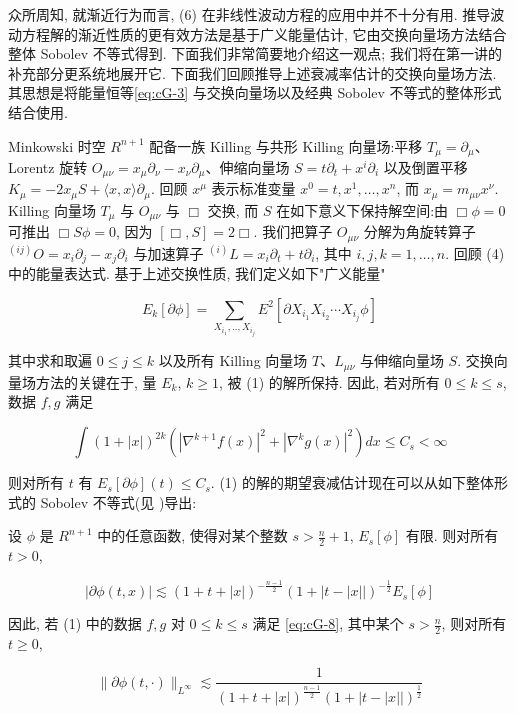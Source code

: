众所周知, 就渐近行为而言, (6) 在非线性波动方程的应用中并不十分有用. 推导波动方程解的渐近性质的更有效方法是基于广义能量估计, 它由交换向量场方法结合整体 Sobolev 不等式得到. 下面我们非常简要地介绍这一观点; 我们将在第一讲的补充部分更系统地展开它. 下面我们回顾推导上述衰减率估计的交换向量场方法. 其思想是将能量恒等\eqref{eq:cG-3} 与交换向量场以及经典 Sobolev 不等式的整体形式结合使用. 

Minkowski 时空 $R^{n+1}$ 配备一族 Killing 与共形 Killing 向量场:平移 $T_{\mu} = \partial_{\mu}$、Lorentz 旋转 $O_{\mu\nu} = x_{\mu}\partial_{\nu} - x_{\nu}\partial_{\mu}$、伸缩向量场 $S = t\partial_{t} + x^{i}\partial_{i}$ 以及倒置平移 $K_{\mu} = -2x_{\mu}S + \langle x,  x \rangle \partial_{\mu}$. 回顾 $x^{\mu}$ 表示标准变量 $x^{0} = t,  x^{1},  \ldots,  x^{n}$, 而 $x_{\mu} = m_{\mu\nu}x^{\nu}$. Killing 向量场 $T_{\mu}$ 与 $O_{\mu\nu}$ 与 $\Box$ 交换, 而 $S$ 在如下意义下保持解空间:由 $\Box\phi = 0$ 可推出 $\Box S\phi = 0$, 因为 $[\Box,  S] = 2\Box$. 我们把算子 $O_{\mu\nu}$ 分解为角旋转算子 $^{(ij)}O = x_{i}\partial_{j} - x_{j}\partial_{i}$ 与加速算子 $^{(i)}L = x_{i}\partial_{t} + t\partial_{i}$, 其中 $i,  j,  k = 1,  \ldots,  n$. 回顾 (4) 中的能量表达式. 基于上述交换性质, 我们定义如下"广义能量"

\begin{equation}
E _ {k} [ \partial \phi ] = \sum_ {X _ {i _ {1}}, ..,  X _ {i _ {j}}} E ^ {2} [ \partial X _ {i _ {1}} X _ {i _ {2}} \cdots X _ {i _ {j}} \phi ]\label{eq:cG-7}
\end{equation}

其中求和取遍 $0 \leq j \leq k$ 以及所有 Killing 向量场 $T$、$L_{\mu\nu}$ 与伸缩向量场 $S$. 交换向量场方法的关键在于, 量 $E_{k}$, $k \geq 1$, 被 (1) 的解所保持. 因此, 若对所有 $0 \leq k \leq s$, 数据 $f,  g$ 满足

\begin{equation}
\int (1 + | x |) ^ {2 k} \left(| \nabla^ {k + 1} f (x) | ^ {2} + | \nabla^ {k} g (x) | ^ {2}\right) d x \leq C _ {s} < \infty\label{eq:cG-8}
\end{equation}

则对所有 $t$ 有 $E_{s}[\partial \phi](t) \leq C_{s}$. (1) 的解的期望衰减估计现在可以从如下整体形式的 Sobolev 不等式(见 \cite{gfref27})导出:

\begin{proposition}[衰减估计{[}27{]}]\label{prop:cG-1.6}
设 $\phi$ 是 $R^{n + 1}$ 中的任意函数, 使得对某个整数 $s > \frac{n}{2} +1$, $E_{s}[\phi]$ 有限. 则对所有 $t > 0$, 

\begin{equation}
| \partial \phi (t,  x) | \lesssim (1 + t + | x |) ^ {- \frac {n - 1}{2}} (1 + | t - | x | |) ^ {- \frac {1}{2}} E _ {s} [ \phi ]\label{eq:cG-9}
\end{equation}

因此, 若 (1) 中的数据 $f,  g$ 对 $0 \leq k \leq s$ 满足 \eqref{eq:cG-8}, 其中某个 $s > \frac{n}{2}$, 则对所有 $t \geq 0$, 

\begin{equation}
\| \partial \phi (t, \cdot) \| _ {L ^ {\infty}} \lesssim \frac {1}{(1 + t + | x |) ^ {\frac {n - 1}{2}} (1 + | t - | x | |) ^ {\frac {1}{2}}}\label{eq:cG-10}
\end{equation}
\end{proposition}

